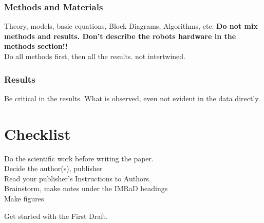\documentclass[a4paper]{article}
\begin{document}
\subsubsection{Methods and Materials}
Theory, models, basic equations, Block Diagrams, Algorithms, etc.
\textbf{ Do not mix methods and results.  Don't describe the robots hardware in the methods section!! }\\
Do all methods first, then all the results. not intertwined.

\subsubsection{Results}


Be critical in the results. What is observed, even not evident in the data directly.


\section{Checklist}
Do the scientific work before writing the paper.\\
Decide the author(s), publisher\\
Read your publisher's Instructions to Authors.\\
Brainstorm, make notes under the IMRaD headings \\
Make figures


Get started with the First Draft.
\end{document}
